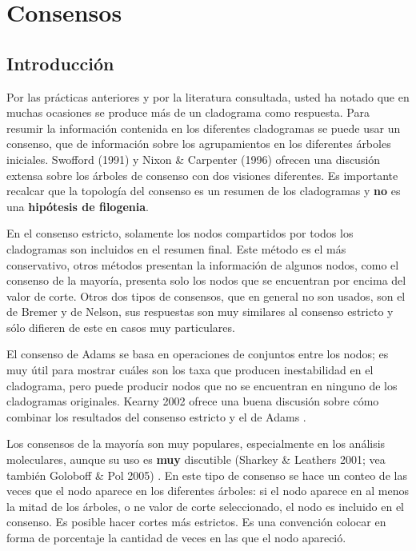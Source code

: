 \chapter{Consensos}
\section*{Introducci\'on}
Por las pr\'acticas anteriores y por la literatura consultada, usted ha notado que en muchas ocasiones se produce m\'as de un cladograma como respuesta. Para resumir la informaci\'on contenida en los diferentes cladogramas se puede usar un consenso, que de informaci\'on sobre los agrupamientos en los diferentes \'arboles iniciales. Swofford (1991) \cite{Swofford1991} y Nixon \& Carpenter (1996) \cite{Nixon1996} ofrecen una discusi\'on extensa sobre los \'arboles de consenso con dos visiones diferentes. Es importante recalcar que la topolog\'ia del consenso es un resumen de los cladogramas y \textbf{no} es una \textbf{hip\'otesis de filogenia}.


En el consenso estricto, solamente los nodos compartidos por todos los cladogramas son incluidos en el resumen final. Este m\'etodo es el m\'as conservativo, otros m\'etodos presentan la informaci\'on de algunos nodos, como el consenso de la mayor\'ia, presenta solo los nodos que se encuentran por encima del valor de corte. Otros dos tipos de consensos, que en general no son usados, son el de Bremer y de Nelson, sus respuestas son muy similares al consenso estricto y s\'olo difieren de este en casos muy particulares.


El consenso de Adams se basa en operaciones de conjuntos entre los nodos; es muy \'util para mostrar cu\'ales son los taxa que producen inestabilidad en el cladograma, pero puede producir nodos que no se encuentran en ninguno de los cladogramas originales. Kearny 2002 ofrece una buena discusi\'on sobre c\'omo combinar los resultados del consenso estricto y el de Adams \cite{Kearney2002}.

Los consensos de la mayor\'ia son muy populares, especialmente en los an\'alisis moleculares, aunque su uso es \textbf{muy} discutible (Sharkey \& Leathers 2001; vea tambi\'en Goloboff \& Pol 2005) \cite{Sharkey2001} \cite{Goloboff2005}. En este tipo de consenso se hace un conteo de las veces que el nodo aparece en los diferentes \'arboles: si el nodo aparece en al menos la mitad de los \'arboles, o ne valor de corte seleccionado, el nodo es incluido en el consenso. Es posible hacer cortes m\'as estrictos. Es una convenci\'on colocar en forma de porcentaje la cantidad de veces en las que el nodo apareci\'o.


